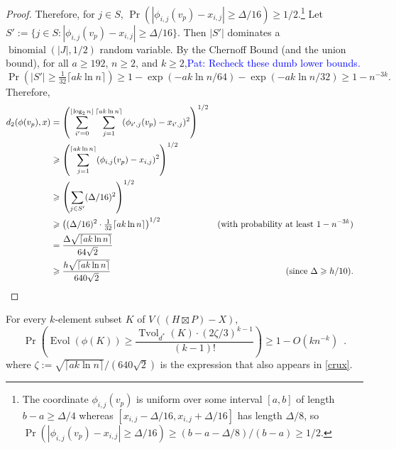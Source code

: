 \documentclass{patmorin}
\renewcommand{\ge}{\geqslant}
\newcommand{\pat}[1]{\textcolor{Blue}{Pat: #1}}
\DeclareMathOperator{\evol}{Evol}
\DeclareMathOperator{\tvol}{Tvol}
\begin{document}
\begin{proof}
  Therefore, for $j\in S$, $\Pr(|\phi_{i,j}(v_p)-x_{i,j}|\ge \Delta/16)\ge 1/2$.\footnote{The coordinate $\phi_{i,j}(v_p)$ is uniform over some interval $[a,b]$ of length $b-a\ge \Delta/4$ whereas $[x_{i,j}-\Delta/16,x_{i,j}+\Delta/16]$ has length $\Delta/8$, so $\Pr(|\phi_{i,j}(v_p)-x_{i,j}|\ge \Delta/16)\ge (b-a-\Delta/8)/(b-a)\ge 1/2$.}
  Let $S':=\{j\in S:  |\phi_{i,j}(v_p)-x_{i,j}|\ge \Delta/16\}$.  Then $|S'|$ dominates a $\operatorname{binomial}(|J|,1/2)$ random variable.  By the Chernoff Bound (and the union bound), for all $a\ge 192$, $n\ge 2$, and $k\ge 2$,\pat{Recheck these dumb lower bounds.}
  \[
    \Pr(|S'|\ge \tfrac{1}{32}\lceil a k\ln n\rceil)\ge 1-\exp(-ak\ln n/64)-\exp(-ak\ln n/32)\ge 1-n^{-3k}.
  \]
  Therefore,
  \begin{align*}
    d_2(\phi(v_p),x)
    & = \left(\sum_{i'=0}^{\lfloor\log_2 n\rfloor}\sum_{j=1}^{\lceil ak\ln  n\rceil}(\phi_{i',j}(v_p)-x_{i',j})^2\right)^{1/2} \\
    & \ge \left(\sum_{j=1}^{\lceil ak\ln  n\rceil}(\phi_{i,j}(v_p)-x_{i,j})^2\right)^{1/2} \\
    & \ge \left(\sum_{j\in S'}(\Delta/16)^2\right)^{1/2} \\
    & \ge \left((\Delta/16)^2\cdot \tfrac{1}{32}\lceil ak\ln  n\rceil\right)^{1/2}
      & \text{(with probability at least $1-n^{-3k}$)} \\
    & = \frac{\Delta\sqrt{\lceil ak\ln n\rceil}}{64\sqrt{2}} \\
    & \ge \frac{h\sqrt{\lceil ak\ln n\rceil}}{640\sqrt{2}}
     & \text{(since $\Delta\ge h/10$)}. &
    \qedhere
  \end{align*}
\end{proof}

\begin{lem}\label{volume_preserver}
  For every $k$-element subset $K$ of $V((H\boxtimes P)-X)$,
  \[
    \Pr\left(\evol(\phi(K)) \ge \frac{\tvol_{d^*}(K)\cdot(2\zeta/3)^{k-1}}{(k-1)!}\right) \ge 1- O(kn^{-k}) \enspace .
  \]
  where $\zeta:=\sqrt{\lceil ak\ln n\rceil}/(640\sqrt{2})$ is the expression that also appears in \cref{crux}.
\end{lem}
\end{document}
